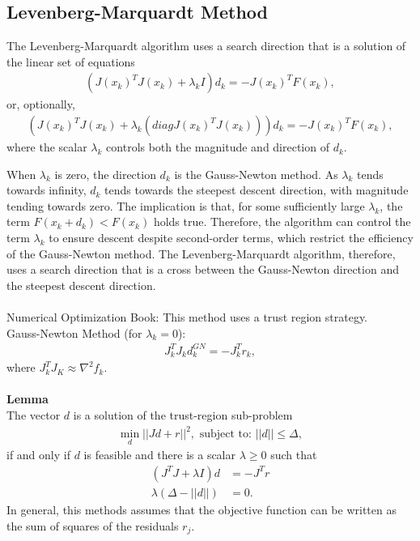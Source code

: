\documentclass[11pt, a4paper]{article}
\theoremstyle{definition}
\begin{document}
\subsection{Levenberg-Marquardt Method}

The Levenberg-Marquardt algorithm uses a search direction that is a solution of the linear set of equations
\begin{align*}
(J(x_k)^T J(x_k) + \lambda_k I)d_k = -J(x_k)^T F(x_k),
\end{align*}
or, optionally,
\begin{align*}
(J(x_k)^T J(x_k) + \lambda_k (diag J(x_k)^T J(x_k)))d_k = -J(x_k)^T F(x_k),
\end{align*}
where the scalar $\lambda_k$ controls both the magnitude and direction of $d_k$.


When $\lambda_k$ is zero, the direction $d_k$ is the Gauss-Newton method. As $\lambda_k$ tends towards infinity, $d_k$ tends towards the steepest descent direction, with magnitude tending towards zero. The implication is that, for some sufficiently large $\lambda_k$, the term $F(x_k + d_k) <  F(x_k)$ holds true. Therefore, the algorithm can control the term $\lambda_k$ to ensure descent despite second-order terms, which restrict the efficiency of the Gauss-Newton method. The Levenberg-Marquardt algorithm, therefore, uses a search direction that is a cross between the Gauss-Newton direction and the steepest descent direction.
\\
\\
Numerical Optimization Book:
This method uses a trust region strategy. \\
Gauss-Newton Method (for $\lambda_k =0$):
\begin{align*}
J^T_kJ_k d_k^{GN}=-J_k^Tr_k,
\end{align*}
where $J^T_kJ_K \approx \nabla^2 f_k$.\\
\\
\textbf{Lemma}\\
The vector $d$ is a solution of the trust-region sub-problem
\begin{align*}
\min_d ||Jd+r||^2,
\text{ subject to: } ||d||\leq \Delta,
\end{align*}
if and only if $d$ is feasible and there is a scalar $\lambda \geq 0$ such that
\begin{align*}
(J^TJ + \lambda I)d &=-J^Tr\\
\lambda(\Delta - ||d||) &=0.
\end{align*}
In general, this methods assumes that the objective function can be written as the sum of squares of the residuals $r_j$.
\end{document}
